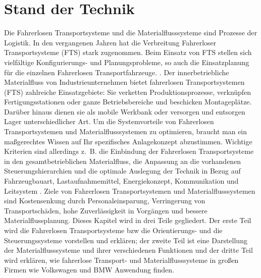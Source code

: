 \section{Stand der Technik}
Die Fahrerlosen Transportsysteme und die Materialflusssysteme sind Prozesse der Logistik. In den vergangenen Jahren 
hat die Verbreitung Fahrerloser Transportsysteme (FTS) stark zugenommen. Beim Einsatz von FTS stellen sich vielfältige 
Konfigurierungs- und Planungsprobleme, so auch die Einsatzplanung f\"ur die einzelnen Fahrerlosen Transportfahrzeuge. 
\cite[vgl.][S. 2]{Guenther:Krueger:2000}. Der innerbetriebliche Materialfluss von Industrieunternehmen bietet 
fahrerlosen Transportsystemen (FTS) zahlreiche Einsatzgebiete: Sie verketten Produktionsprozesse, verknüpfen 
Fertigungsstationen oder ganze Betriebsbereiche und beschicken Montageplätze. Darüber hinaus dienen sie als 
mobile Werkbank oder versorgen und entsorgen Lager unterschiedlicher Art. Um die Systemvorteile von Fahrerlosen 
Transportsystemen und Materialflusssystemen zu optimieren, braucht man ein ma\ss gerechtes Wissen auf Ihr spezifisches 
Anlagekonzept abzustimmen. Wichtige Kriterien sind allerdings z.~B. die Einbindung der Fahrerlosen Transportsysteme in 
den gesamtbetrieblichen Materialfluss, die Anpassung an die vorhandenen Steuerungshierarchien und die optimale Auslegung 
der Technik in Bezug auf Fahrzeugbauart, Lastaufnahmemittel, Energiekonzept, Kommunikation und Leitsystem \cite[vgl.][S. 2]{Werner:2014:Online}.
Ziele von Fahrerlosen Transportsystemen und Materialflusssystemen sind Kostensenkung durch Personaleinsparung, 
Verringerung von Transportsch\"aden, hohe Zuverl\"assigkeit in Vorg\"angen und bessere Materialflussplanung.
Dieses Kapitel wird in drei Teile gegliedert. Der erste Teil wird die Fahrerlosen Transportsysteme bzw die 
Orientierungs- und die Steuerungssysteme vorstellen und erkl\"aren; der zweite Teil ist eine Darstellung der 
Materialflusssysteme und ihrer verschiedenen Funktionen und der dritte Teil wird erkl\"aren, wie fahrerlose 
Transport- und Materialflusssysteme in gro\ss en Firmen wie Volkswagen und BMW Anwendung finden.

